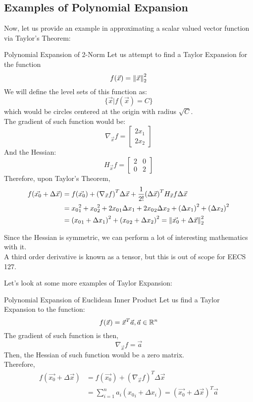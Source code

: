 \subsection{Examples of Polynomial Expansion}
Now, let us provide an example in approximating a scalar valued vector function via Taylor's Theorem:
\begin{ln-explain}{Polynomial Expansion of 2-Norm}{}
    Let us attempt to find a Taylor Expansion for the function
    \[f(\vec{x}) = \pnorm[2]{\vec{x}}{2}\]
    We will define the level sets of this function as:
    \[
        \{\vec{x} \big| f(\vec{x}) = C\}
    \]
    which would be circles centered at the origin with radius $\sqrt{C}$. \\
    The gradient of such function would be:
    \[
        \nabla_{\vec{x}}f = \begin{bmatrix} 2x_1 \\ 2x_2 \end{bmatrix}
    \]
    And the Hessian:
    \[
        H_{\vec{x}}f = \begin{bmatrix} 2 & 0 \\ 0 & 2 \end{bmatrix}
    \]
    Therefore, upon Taylor's Theorem,
    \begin{align*}
        f(\vec{x_0} + \Delta \vec{x})
        &= f(\vec{x_0}) + {(\nabla_{\vec{x}}f)}^T \Delta \vec{x} + \frac{1}{2!} {(\Delta \vec{x})}^T H_{\vec{x}}f \Delta \vec{x} \\
        &= {x_0}_1^2 + {x_0}_2^2 + 2{x_0}_1 \Delta x_1 + 2{x_0}_2 \Delta x_2 + {(\Delta x_1)}^2 + {(\Delta x_2)}^2 \\
        &= {({x_0}_1 + \Delta x_1)}^2 + {({x_0}_2 + \Delta x_2)}^2 = \pnorm[2]{\vec{x_0} + \Delta \vec{x}}{2}
    \end{align*}
\end{ln-explain}
Since the Hessian is symmetric, we can perform a lot of interesting mathematics with it. \\
A third order derivative is known as a tensor, but this is out of scope for EECS 127.

Let's look at some more examples of Taylor Expansion:
\begin{ln-explain}{Polynomial Expansion of Euclidean Inner Product}{}
    Let us find a Taylor Expansion to the function:
    \[
        f(\vec{x}) = \vec{x}^T \vec{a}, \vec{a} \in \R^n
    \]
    The gradient of such function is then,
    \[
        \nabla_{\vec{x}} f = \vec{a}
    \]
    Then, the Hessian of such function would be a zero matrix. \\
    Therefore,
    \begin{align*}
        f(\vec{x_0} + \Delta \vec{x})
        &= f(\vec{x_0}) + {(\nabla_{\vec{x}} f)}^T \Delta \vec{x} \\
        &= \sum_{i = 1}^n a_i ({x_0}_i + \Delta x_i) = {(\vec{x_0} + \Delta \vec{x})}^T \vec{a}
    \end{align*}
\end{ln-explain}


